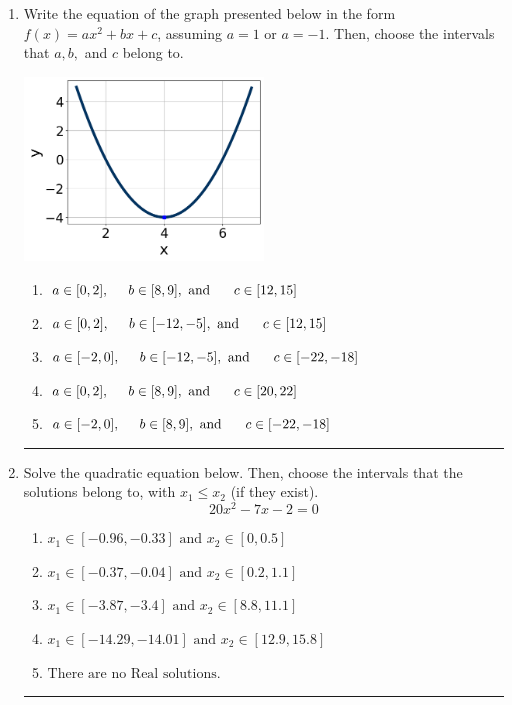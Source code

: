 \documentclass[14pt]{extbook}
\newcommand{\litem}[1]{\item#1\hspace*{-1cm}\rule{\textwidth}{0.4pt}}
\begin{document}
\begin{enumerate}
{\begin{enumerate}[label=\Alph*.]
\end{enumerate} }
\litem{
Write the equation of the graph presented below in the form $f(x)=ax^2+bx+c$, assuming  $a=1$ or $a=-1$. Then, choose the intervals that $a, b,$ and $c$ belong to.
\begin{center}
    \includegraphics[width=0.5\textwidth]{../Figures/quadraticGraphToEquationCopyB.png}
\end{center}
\begin{enumerate}[label=\Alph*.]
\item \( a \in [0, 2], \hspace*{5mm} b \in [8, 9], \text{ and } \hspace*{5mm} c \in [12, 15] \)
\item \( a \in [0, 2], \hspace*{5mm} b \in [-12, -5], \text{ and } \hspace*{5mm} c \in [12, 15] \)
\item \( a \in [-2, 0], \hspace*{5mm} b \in [-12, -5], \text{ and } \hspace*{5mm} c \in [-22, -18] \)
\item \( a \in [0, 2], \hspace*{5mm} b \in [8, 9], \text{ and } \hspace*{5mm} c \in [20, 22] \)
\item \( a \in [-2, 0], \hspace*{5mm} b \in [8, 9], \text{ and } \hspace*{5mm} c \in [-22, -18] \)

\end{enumerate} }
\litem{
Solve the quadratic equation below. Then, choose the intervals that the solutions belong to, with $x_1 \leq x_2$ (if they exist).\[ 20x^{2} -7 x -2 = 0 \]\begin{enumerate}[label=\Alph*.]
\item \( x_1 \in [-0.96, -0.33] \text{ and } x_2 \in [0, 0.5] \)
\item \( x_1 \in [-0.37, -0.04] \text{ and } x_2 \in [0.2, 1.1] \)
\item \( x_1 \in [-3.87, -3.4] \text{ and } x_2 \in [8.8, 11.1] \)
\item \( x_1 \in [-14.29, -14.01] \text{ and } x_2 \in [12.9, 15.8] \)
\item \( \text{There are no Real solutions.} \)


\end{enumerate}}
\end{enumerate}
\end{document}
